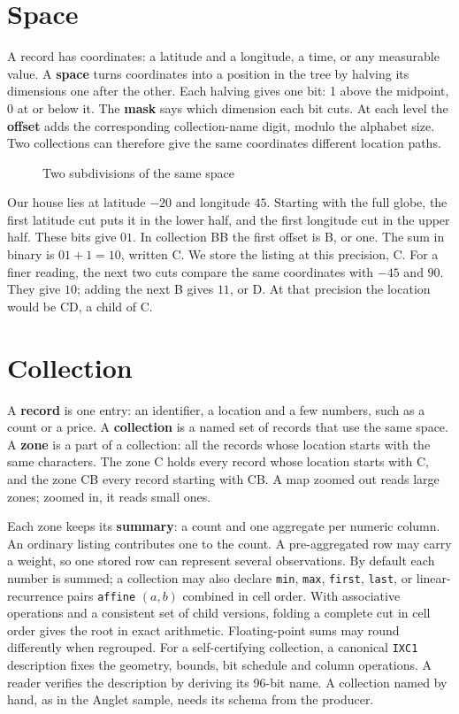 \documentclass[11pt]{article}
\begin{document}
\section{Space}\hypertarget{ix:space}{}
A record has coordinates: a latitude and a longitude, a time, or any measurable value. A \textbf{space} turns coordinates into a position in the tree by halving its dimensions one after the other. Each halving gives one bit: 1 above the midpoint, 0 at or below it. The \textbf{mask} says which dimension each bit cuts. At each level the \textbf{offset} adds the corresponding collection-name digit, modulo the alphabet size. Two collections can therefore give the same coordinates different location paths.

\begin{figure}[H]
    \centering
    \caption{Two subdivisions of the same space}
\end{figure}

Our house lies at latitude $-20$ and longitude $45$. Starting with the full globe, the first latitude cut puts it in the lower half, and the first longitude cut in the upper half. These bits give $01$. In collection BB the first offset is B, or one. The sum in binary is $01+1=10$, written C. We store the listing at this precision, C. For a finer reading, the next two cuts compare the same coordinates with $-45$ and $90$. They give $10$; adding the next B gives $11$, or D. At that precision the location would be CD, a child of C.

\section{Collection}\hypertarget{ix:collection}{}
A \textbf{record} is one entry: an identifier, a location and a few numbers, such as a count or a price. A \textbf{collection} is a named set of records that use the same space. A \textbf{zone} is a part of a collection: all the records whose location starts with the same characters. The zone C holds every record whose location starts with C, and the zone CB every record starting with CB. A map zoomed out reads large zones; zoomed in, it reads small ones.

Each zone keeps its \textbf{summary}: a count and one aggregate per numeric column. An ordinary listing contributes one to the count. A pre-aggregated row may carry a weight, so one stored row can represent several observations. By default each number is summed; a collection may also declare \texttt{min}, \texttt{max}, \texttt{first}, \texttt{last}, or linear-recurrence pairs \texttt{affine} $(a, b)$ combined in cell order. With associative operations and a consistent set of child versions, folding a complete cut in cell order gives the root in exact arithmetic. Floating-point sums may round differently when regrouped. For a self-certifying collection, a canonical \texttt{IXC1} description fixes the geometry, bounds, bit schedule and column operations. A reader verifies the description by deriving its 96-bit name. A collection named by hand, as in the Anglet sample, needs its schema from the producer.
\end{document}
